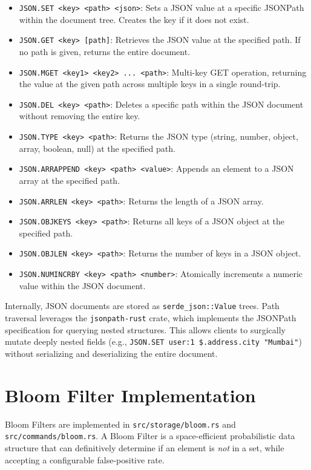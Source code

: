\begin{itemize}[leftmargin=2.5em]
    \item \texttt{JSON.SET <key> <path> <json>}: Sets a JSON value at a specific JSONPath within the document tree. Creates the key if it does not exist.
    \item \texttt{JSON.GET <key> [path]}: Retrieves the JSON value at the specified path. If no path is given, returns the entire document.
    \item \texttt{JSON.MGET <key1> <key2> ... <path>}: Multi-key GET operation, returning the value at the given path across multiple keys in a single round-trip.
    \item \texttt{JSON.DEL <key> <path>}: Deletes a specific path within the JSON document without removing the entire key.
    \item \texttt{JSON.TYPE <key> <path>}: Returns the JSON type (string, number, object, array, boolean, null) at the specified path.
    \item \texttt{JSON.ARRAPPEND <key> <path> <value>}: Appends an element to a JSON array at the specified path.
    \item \texttt{JSON.ARRLEN <key> <path>}: Returns the length of a JSON array.
    \item \texttt{JSON.OBJKEYS <key> <path>}: Returns all keys of a JSON object at the specified path.
    \item \texttt{JSON.OBJLEN <key> <path>}: Returns the number of keys in a JSON object.
    \item \texttt{JSON.NUMINCRBY <key> <path> <number>}: Atomically increments a numeric value within the JSON document.
\end{itemize}

Internally, JSON documents are stored as \texttt{serde\_json::Value} trees. Path traversal leverages the \texttt{jsonpath-rust} crate, which implements the JSONPath specification for querying nested structures. This allows clients to surgically mutate deeply nested fields (e.g., \texttt{JSON.SET user:1 \$.address.city "Mumbai"}) without serializing and deserializing the entire document.

\section{Bloom Filter Implementation}

Bloom Filters are implemented in \texttt{src/storage/bloom.rs} and \texttt{src/commands/bloom.rs}. A Bloom Filter is a space-efficient probabilistic data structure that can definitively determine if an element is \textit{not} in a set, while accepting a configurable false-positive rate.

